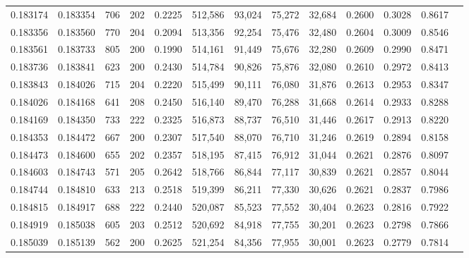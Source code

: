 \begin{tabular}{rrrrrrrrrrrrr}
0.183174 & 0.183354 &   706 & 202 &                                     0.2225 & 512,586 &  93,024 &  75,272 &  32,684 & 0.2600 & 0.3028 & 0.8617 \\
0.183356 & 0.183560 &   770 & 204 &                                     0.2094 & 513,356 &  92,254 &  75,476 &  32,480 & 0.2604 & 0.3009 & 0.8546 \\
0.183561 & 0.183733 &   805 & 200 &                                     0.1990 & 514,161 &  91,449 &  75,676 &  32,280 & 0.2609 & 0.2990 & 0.8471 \\
0.183736 & 0.183841 &   623 & 200 &                                     0.2430 & 514,784 &  90,826 &  75,876 &  32,080 & 0.2610 & 0.2972 & 0.8413 \\
0.183843 & 0.184026 &   715 & 204 &                                     0.2220 & 515,499 &  90,111 &  76,080 &  31,876 & 0.2613 & 0.2953 & 0.8347 \\
0.184026 & 0.184168 &   641 & 208 &                                     0.2450 & 516,140 &  89,470 &  76,288 &  31,668 & 0.2614 & 0.2933 & 0.8288 \\
0.184169 & 0.184350 &   733 & 222 &                                     0.2325 & 516,873 &  88,737 &  76,510 &  31,446 & 0.2617 & 0.2913 & 0.8220 \\
0.184353 & 0.184472 &   667 & 200 &                                     0.2307 & 517,540 &  88,070 &  76,710 &  31,246 & 0.2619 & 0.2894 & 0.8158 \\
0.184473 & 0.184600 &   655 & 202 &                                     0.2357 & 518,195 &  87,415 &  76,912 &  31,044 & 0.2621 & 0.2876 & 0.8097 \\
0.184603 & 0.184743 &   571 & 205 &                                     0.2642 & 518,766 &  86,844 &  77,117 &  30,839 & 0.2621 & 0.2857 & 0.8044 \\
0.184744 & 0.184810 &   633 & 213 &                                     0.2518 & 519,399 &  86,211 &  77,330 &  30,626 & 0.2621 & 0.2837 & 0.7986 \\
0.184815 & 0.184917 &   688 & 222 &                                     0.2440 & 520,087 &  85,523 &  77,552 &  30,404 & 0.2623 & 0.2816 & 0.7922 \\
0.184919 & 0.185038 &   605 & 203 &                                     0.2512 & 520,692 &  84,918 &  77,755 &  30,201 & 0.2623 & 0.2798 & 0.7866 \\
0.185039 & 0.185139 &   562 & 200 &                                     0.2625 & 521,254 &  84,356 &  77,955 &  30,001 & 0.2623 & 0.2779 & 0.7814 \\

\end{tabular}
